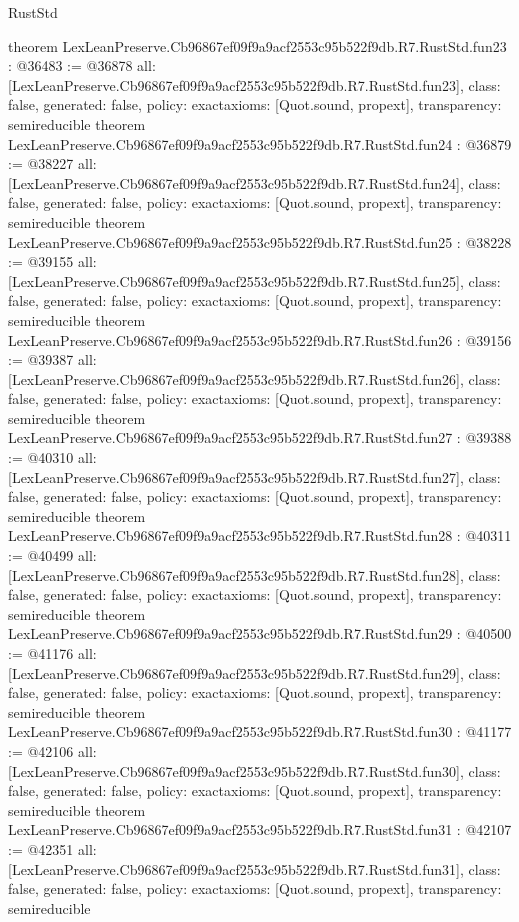 \begin{lexlean}{RustStd}
\begin{coremodule}
{}
theorem LexLeanPreserve.Cb96867ef09f9a9acf2553c95b522f9db.R7.RustStd.fun23 : @36483 := @36878 {
  all: [LexLeanPreserve.Cb96867ef09f9a9acf2553c95b522f9db.R7.RustStd.fun23],
  class: false,
  generated: false,
  policy: exact{axioms: [Quot.sound, propext]},
  transparency: semireducible
}
theorem LexLeanPreserve.Cb96867ef09f9a9acf2553c95b522f9db.R7.RustStd.fun24 : @36879 := @38227 {
  all: [LexLeanPreserve.Cb96867ef09f9a9acf2553c95b522f9db.R7.RustStd.fun24],
  class: false,
  generated: false,
  policy: exact{axioms: [Quot.sound, propext]},
  transparency: semireducible
}
theorem LexLeanPreserve.Cb96867ef09f9a9acf2553c95b522f9db.R7.RustStd.fun25 : @38228 := @39155 {
  all: [LexLeanPreserve.Cb96867ef09f9a9acf2553c95b522f9db.R7.RustStd.fun25],
  class: false,
  generated: false,
  policy: exact{axioms: [Quot.sound, propext]},
  transparency: semireducible
}
theorem LexLeanPreserve.Cb96867ef09f9a9acf2553c95b522f9db.R7.RustStd.fun26 : @39156 := @39387 {
  all: [LexLeanPreserve.Cb96867ef09f9a9acf2553c95b522f9db.R7.RustStd.fun26],
  class: false,
  generated: false,
  policy: exact{axioms: [Quot.sound, propext]},
  transparency: semireducible
}
theorem LexLeanPreserve.Cb96867ef09f9a9acf2553c95b522f9db.R7.RustStd.fun27 : @39388 := @40310 {
  all: [LexLeanPreserve.Cb96867ef09f9a9acf2553c95b522f9db.R7.RustStd.fun27],
  class: false,
  generated: false,
  policy: exact{axioms: [Quot.sound, propext]},
  transparency: semireducible
}
theorem LexLeanPreserve.Cb96867ef09f9a9acf2553c95b522f9db.R7.RustStd.fun28 : @40311 := @40499 {
  all: [LexLeanPreserve.Cb96867ef09f9a9acf2553c95b522f9db.R7.RustStd.fun28],
  class: false,
  generated: false,
  policy: exact{axioms: [Quot.sound, propext]},
  transparency: semireducible
}
theorem LexLeanPreserve.Cb96867ef09f9a9acf2553c95b522f9db.R7.RustStd.fun29 : @40500 := @41176 {
  all: [LexLeanPreserve.Cb96867ef09f9a9acf2553c95b522f9db.R7.RustStd.fun29],
  class: false,
  generated: false,
  policy: exact{axioms: [Quot.sound, propext]},
  transparency: semireducible
}
theorem LexLeanPreserve.Cb96867ef09f9a9acf2553c95b522f9db.R7.RustStd.fun30 : @41177 := @42106 {
  all: [LexLeanPreserve.Cb96867ef09f9a9acf2553c95b522f9db.R7.RustStd.fun30],
  class: false,
  generated: false,
  policy: exact{axioms: [Quot.sound, propext]},
  transparency: semireducible
}
theorem LexLeanPreserve.Cb96867ef09f9a9acf2553c95b522f9db.R7.RustStd.fun31 : @42107 := @42351 {
  all: [LexLeanPreserve.Cb96867ef09f9a9acf2553c95b522f9db.R7.RustStd.fun31],
  class: false,
  generated: false,
  policy: exact{axioms: [Quot.sound, propext]},
  transparency: semireducible
}
\end{coremodule}
\end{lexlean}

